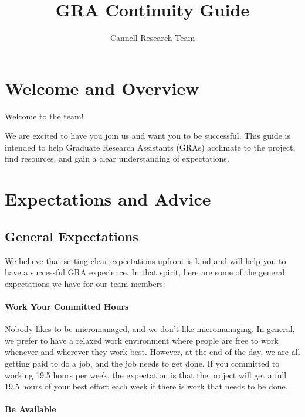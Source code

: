 \documentclass[
  letterpaper,
  DIV=11,
  numbers=noendperiod]{scrreprt}
\title{GRA Continuity Guide}
\author{Cannell Research Team}
\date{}
\renewcommand*\contentsname{Table of contents}
\newcommand\contentsname{Table of contents}
\begin{document}
\maketitle

\renewcommand*\contentsname{Table of contents}
{
\hypersetup{linkcolor=}
\setcounter{tocdepth}{2}
\tableofcontents
}

\chapter{Welcome and Overview}\label{sec-welcome}

Welcome to the team!

We are excited to have you join us and want you to be successful. This
guide is intended to help Graduate Research Assistants (GRAs) acclimate
to the project, find resources, and gain a clear understanding of
expectations.


\chapter{Expectations and Advice}\label{sec-expectations}

\section{General Expectations}\label{general-expectations}

We believe that setting clear expectations upfront is kind and will help
you to have a successful GRA experience. In that spirit, here are some
of the general expectations we have for our team members:

\subsubsection{Work Your Committed
Hours}\label{work-your-committed-hours}

Nobody likes to be micromanaged, and we don't like micromanaging. In
general, we prefer to have a relaxed work environment where people are
free to work whenever and wherever they work best. However, at the end
of the day, we are all getting paid to do a job, and the job needs to
get done. If you committed to working 19.5 hours per week, the
expectation is that the project will get a full 19.5 hours of your best
effort each week if there is work that needs to be done.

\subsubsection{Be Available}\label{be-available}
\end{document}
